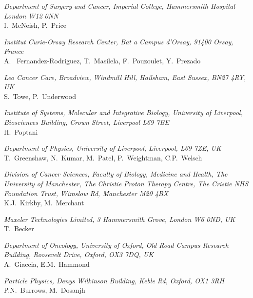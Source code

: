 \vspace{0.5cm}
\noindent \textit{Department of Surgery and Cancer, Imperial College, Hammersmith Hospital London W12 0NN} \\
I.~McNeish, P.~Price
 
\vspace{0.5cm}
\noindent \textit{Institut Curie-Orsay Research Center, Bat a Campus d'Orsay, 91400 Orsay, France} \\
A. ~Fernandez-Rodriguez, T.~Masilela, F.~Pouzoulet, Y.~Prezado
 
\vspace{0.5cm}
\noindent \textit{Leo Cancer Care, Broadview, Windmill Hill, Hailsham, East Sussex, BN27 4RY, UK} \\
S.~Towe, P.~Underwood
 
\vspace{0.5cm}
\noindent \textit{Institute of Systems, Molecular and Integrative Biology, University of Liverpool, Biosciences Building, Crown Street, Liverpool L69 7BE} \\
H.~Poptani
 
\vspace{0.5cm}
\noindent \textit{Department of Physics, University of Liverpool, Liverpool, L69 7ZE, UK} \\
T.~Greenshaw, N.~Kumar, M.~Patel, P.~Weightman, C.P.~Welsch
 
\vspace{0.5cm}
\noindent \textit{Division of Cancer Sciences, Faculty of Biology, Medicine and Health, The University of Manchester, The Christie Proton Therapy Centre, The Cristie NHS Foundation Trust, Wimslow Rd, Manchester M20 4BX} \\
K.J.~Kirkby, M.~Merchant
 
\vspace{0.5cm}
\noindent \textit{Maxeler Technologies Limited, 3 Hammersmith Grove, London W6 0ND, UK} \\
T.~Becker
 
\vspace{0.5cm}
\noindent \textit{Department of Oncology, University of Oxford, Old Road Campus Research Building, Roosevelt Drive, Oxford, OX3 7DQ, UK} \\
A.~Giaccia, E.M.~Hammond
 
\vspace{0.5cm}
\noindent \textit{Particle Physics, Denys Wilkinson Building, Keble Rd, Oxford, OX1 3RH} \\
P.N.~Burrows, M.~Dosanjh
 
